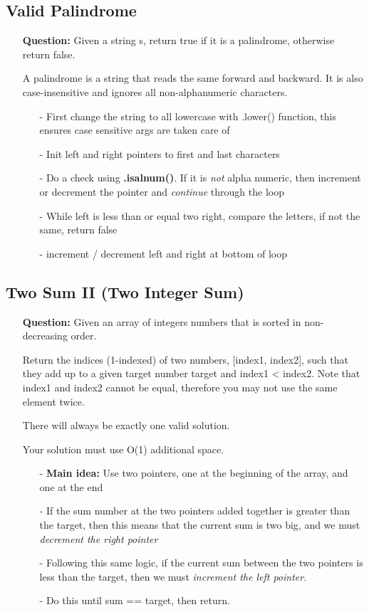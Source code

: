 \documentclass[12pt]{article}
\begin{document}
\subsection{Valid Palindrome}
\begin{enumerate}
  \item[] \textbf{Question:} Given a string s, return true if it is a palindrome, otherwise return false.

A palindrome is a string that reads the same forward and backward. It is also case-insensitive and ignores all non-alphanumeric characters.
    \begin{enumerate}
      \item[-] First change the string to all lowercase with .lower() function, this ensures case sensitive args are taken care of
      \item[-] Init left and right pointers to first and last characters
      \item[-] Do a check using \textbf{.isalnum()}. If it is \textit{not} alpha numeric, then increment or decrement the pointer and \textit{continue} through the loop
      \item[-] While left is less than or equal two right, compare the letters, if not the same, return false
      \item[-] increment / decrement left and right at bottom of loop
    \end{enumerate}
\end{enumerate}


\subsection{Two Sum II (Two Integer Sum)}
\begin{enumerate}
  \item[] \textbf{Question:} Given an array of integers numbers that is sorted in non-decreasing order.

Return the indices (1-indexed) of two numbers, [index1, index2], such that they add up to a given target number target and index1 < index2. Note that index1 and index2 cannot be equal, therefore you may not use the same element twice.

There will always be exactly one valid solution.

Your solution must use O(1) additional space.
    \begin{enumerate}
      \item[-] \textbf{Main idea: } Use two pointers, one at the beginning of the array, and one at the end
      \item[-] If the sum number at the two pointers added together is greater than the target, then this means that the current sum is two big, and we must \textit{decrement the right pointer}
      \item[-] Following this same logic, if the current sum between the two pointers is less than the target, then we must \textit{increment the left pointer}. 
      \item[-] Do this until sum == target, then return.
    \end{enumerate}
\end{enumerate}
\end{document}
